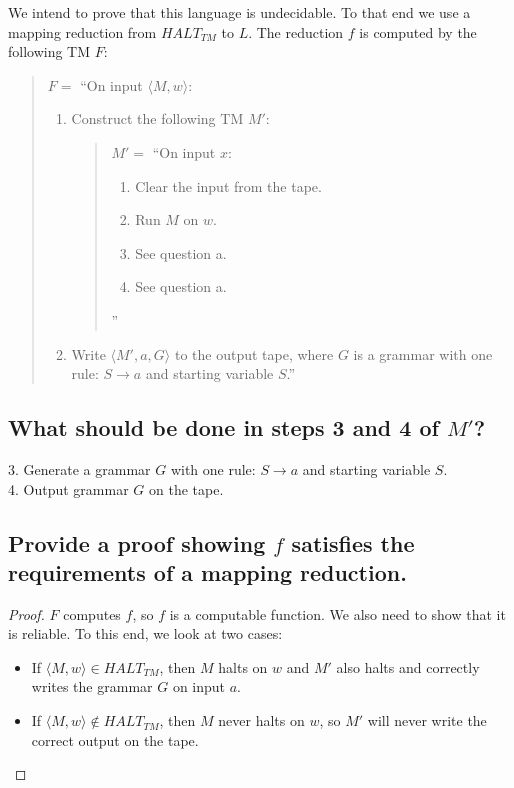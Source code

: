 \documentclass[a4paper,11pt]{article}
\begin{document}
	We intend to prove that this language is undecidable. To that end we use a mapping reduction from $HALT_{TM}$ to $L$. The reduction $f$ is computed by the following TM $F$:

	\begin{quote}
		$F =$ ``On input $\langle M,w \rangle$:
		\begin{enumerate}[label=\arabic*.]
			\item Construct the following TM $M'$:
			\begin{quote}
				$M' =$ ``On input $x$:
				\begin{enumerate}[label=\arabic*.]
					\item Clear the input from the tape.
					\item Run $M$ on $w$.
					\item See question a.
					\item See question a.
				\end{enumerate}
				''
			\end{quote}
			\item Write $\langle M',a,G \rangle$ to the output tape, where $G$ is a grammar with one rule: $S \to a$ and starting variable $S$.''
		\end{enumerate}
	\end{quote}

	\subsection{What should be done in steps 3 and 4 of $M'$?}

	3. Generate a grammar $G$ with one rule: $S\to a$ and starting variable $S$.\\
	4. Output grammar $G$ on the tape.

	\subsection{Provide a proof showing $f$ satisfies the requirements of a mapping reduction.}

	\begin{proof}
		$F$ computes $f$, so $f$ is a computable function. We also need to show that it is reliable. To this end, we look at two cases:
		\begin{itemize}
			\item If $\langle M,w\rangle\in HALT_{TM}$, then $M$ halts on $w$ and $M'$ also halts and correctly writes the grammar $G$ on input $a$.
			\item If $\langle M,w\rangle\notin HALT_{TM}$, then $M$ never halts on $w$, so $M'$ will never write the correct output on the tape.
		\end{itemize}
	\end{proof}
\end{document}
